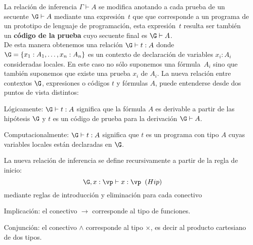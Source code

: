 \documentclass[11pt,letterpaper]{article}
\begin{document}
La relación de inferencia $\Gamma \vdash A$ se modifica anotando a cada prueba
de un secuente $\G\vdash A$ mediante una expresión~$t$ que
que corresponde a un programa de un prototipo de lenguaje de programación,
esta expresión~$t$ resulta ser también un \textbf{código de la prueba} cuyo 
secuente final es $\G\vdash A$.\\

De esta manera obtenemos una relación $\G\vdash t:A$ donde
$\G=\{x_1:A_1,\ldots,x_n:A_n\}$ es un contexto de declaración de
variables $x_i:A_i$ consideradas locales. En este caso no sólo suponemos una
fórmula~$A_i$ sino que también suponemos que existe una prueba $x_i$ de
$A_i$. 
La nueva relación entre contextos $\G$, expresiones o códigos $t$ y fórmulas
$A$, puede entenderse desde dos puntos de vista distintos:
\bi
\item Lógicamente: $\G\vdash t:A$ significa que la fórmula $A$ es
  derivable a partir de las hipótesis $\G$ y $t$ es un código de
  prueba para la derivación $\G\vdash A$.
\item Computacionalmente: $\G\vdash t:A$ significa que $t$ es un
  programa con tipo $A$ cuyas variables locales están declaradas en $\G$.    
\ei

La nueva relación de inferencia se define recursivamente a partir de la regla
de inicio:
\begin{equation*}
\G,x:\vp\vdash x:\vp\;\;(Hip)\;\;\;\;
\end{equation*}
\noindent
mediante reglas de introducción y eliminación para cada conectivo 
\bi
\item Implicación: el conectivo $\to$ corresponde al tipo de funciones.
\begin{mathpar}
 
 \end{mathpar}
 
\item Conjunción: el conectivo $\land$ corresponde al tipo $\times$, es decir
  al producto cartesiano de dos tipos.
\begin{mathpar}
 

\end{mathpar}
\end{document}
